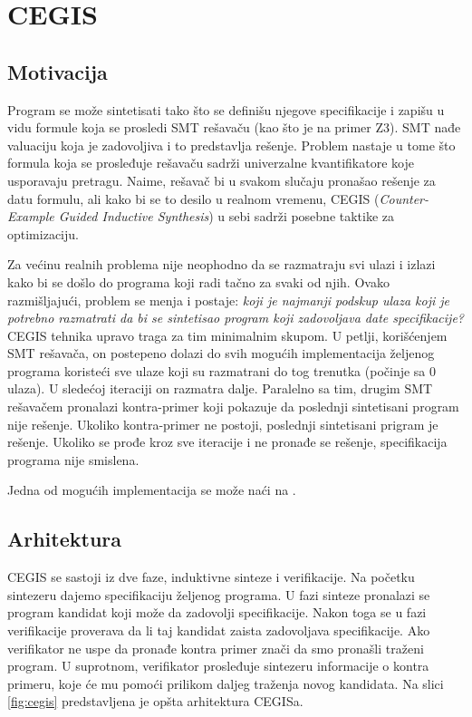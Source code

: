 \section{CEGIS}
\label{sec:cegis}

\subsection{Motivacija}
\label{subsec:Motivacija}

Program se može sintetisati tako što se definišu njegove specifikacije i zapišu u vidu formule koja se prosledi SMT rešavaču (kao što je na primer Z3). SMT nađe valuaciju koja je zadovoljiva i to predstavlja rešenje. Problem nastaje u tome što formula koja se prosleđuje rešavaču sadrži univerzalne kvantifikatore koje usporavaju pretragu. Naime, rešavač bi u svakom slučaju pronašao rešenje za datu formulu, ali kako bi se to desilo u realnom vremenu, CEGIS (\emph{Counter-Example Guided Inductive Synthesis}) u sebi sadrži posebne taktike za optimizaciju.

Za većinu realnih problema nije neophodno da se razmatraju svi ulazi i izlazi kako bi se došlo do programa koji radi tačno za svaki od njih. Ovako razmišljajući, problem se menja i postaje: \emph{koji je najmanji podskup ulaza koji je potrebno razmatrati da bi se sintetisao program koji zadovoljava date specifikacije?}
CEGIS tehnika upravo traga za tim minimalnim skupom. U petlji, korišćenjem SMT rešavača, on postepeno dolazi do svih mogućih implementacija željenog programa koristeći sve ulaze koji su razmatrani do tog trenutka (počinje sa 0 ulaza). U sledećoj iteraciji on razmatra dalje. Paralelno sa tim, drugim SMT rešavačem pronalazi kontra-primer koji pokazuje da poslednji sintetisani program nije rešenje. Ukoliko kontra-primer ne postoji, poslednji sintetisani prigram je rešenje. Ukoliko se prođe kroz sve iteracije i ne pronađe se rešenje, specifikacija programa nije smislena.

Jedna od mogućih implementacija se može naći na \cite{CEGISimpl}.

\subsection{Arhitektura}
\label{subsec:Arhitektura}

CEGIS se sastoji iz dve faze, induktivne sinteze i verifikacije. Na početku sintezeru dajemo specifikaciju željenog programa. U fazi sinteze pronalazi se program kandidat koji može da zadovolji specifikacije. Nakon toga se u fazi verifikacije proverava da li taj kandidat zaista zadovoljava specifikacije. Ako verifikator ne uspe da pronađe kontra primer znači da smo pronašli traženi program. U suprotnom, verifikator prosleđuje sintezeru informacije o kontra primeru, koje će mu pomoći prilikom daljeg traženja novog kandidata. Na slici \ref{fig:cegis} predstavljena je opšta arhitektura CEGISa.

